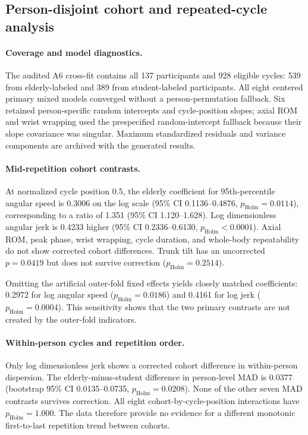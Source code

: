 \subsection{Person-disjoint cohort and repeated-cycle analysis}
\label{sec:cohort-cycle-results}

\paragraph{Coverage and model diagnostics.}
The audited A6 cross-fit contains all 137 participants and 928 eligible cycles:
539 from elderly-labeled and 389 from student-labeled participants. All eight
centered primary mixed models converged without a person-permutation fallback.
Six retained person-specific random intercepts and cycle-position slopes;
axial ROM and wrist wrapping used the prespecified random-intercept fallback
because their slope covariance was singular. Maximum standardized residuals and
variance components are archived with the generated results.



\paragraph{Mid-repetition cohort contrasts.}
At normalized cycle position 0.5, the elderly coefficient for
95th-percentile angular speed is 0.3006 on the log scale (95\% CI
0.1136--0.4876, $p_{\mathrm{Holm}}=0.0114$), corresponding to a ratio of
1.351 (95\% CI 1.120--1.628). Log dimensionless angular jerk is 0.4233
higher (95\% CI 0.2336--0.6130,
$p_{\mathrm{Holm}}<0.0001$). Axial ROM, peak phase, wrist wrapping, cycle
duration, and whole-body repeatability do not show corrected cohort differences.
Trunk tilt has an uncorrected $p=0.0419$ but does not survive correction
($p_{\mathrm{Holm}}=0.2514$).

Omitting the artificial outer-fold fixed effects yields closely matched
coefficients: 0.2972 for log angular speed
($p_{\mathrm{Holm}}=0.0186$) and 0.4161 for log jerk
($p_{\mathrm{Holm}}=0.0004$). This sensitivity shows that the two primary
contrasts are not created by the outer-fold indicators.

\paragraph{Within-person cycles and repetition order.}
Only log dimensionless jerk shows a corrected cohort difference in
within-person dispersion. The elderly-minus-student difference in person-level
MAD is 0.0377 (bootstrap 95\% CI 0.0135--0.0735,
$p_{\mathrm{Holm}}=0.0208$). None of the other seven MAD contrasts survives
correction. All eight cohort-by-cycle-position interactions have
$p_{\mathrm{Holm}}=1.000$. The data therefore provide no evidence for a
different monotonic first-to-last repetition trend between cohorts.

